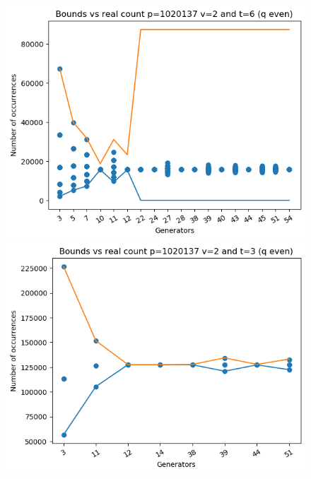 \documentclass{article}
\begin{document}
\begin{figure}[H]
\begin{minipage}{.49\textwidth}
            \includegraphics[width=\textwidth]{../plots/tuples_figures/1020137v2qeven/test_p1020137_v2_t6_q_even.png}
    \end{minipage}
    \begin{minipage}{.49\textwidth}
            \centering
            \includegraphics[width=\textwidth]{../plots/tuples_figures/1020137v2qeven/test_p1020137_v2_t3_q_even.png}

\end{minipage}
\end{figure}
\end{document}
